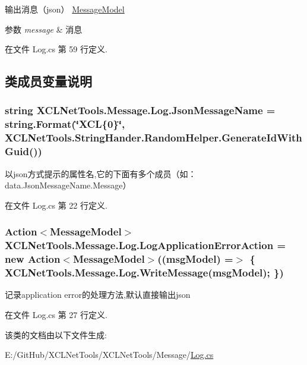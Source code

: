 输出消息（json） \hyperlink{class_x_c_l_net_tools_1_1_message_1_1_message_model}{Message\+Model} 


\begin{DoxyParams}{参数}
{\em message} & 消息\\
\hline
\end{DoxyParams}


在文件 Log.\+cs 第 59 行定义.



\subsection{类成员变量说明}
\subsubsection[{\texorpdfstring{Json\+Message\+Name}{JsonMessageName}}]{\setlength{\rightskip}{0pt plus 5cm}string X\+C\+L\+Net\+Tools.\+Message.\+Log.\+Json\+Message\+Name = string.\+Format(\char`\"{}X\+CL\{0\}\char`\"{}, X\+C\+L\+Net\+Tools.\+String\+Hander.\+Random\+Helper.\+Generate\+Id\+With\+Guid())\hspace{0.3cm}{\ttfamily [static]}}\hypertarget{class_x_c_l_net_tools_1_1_message_1_1_log_ac9218999b3da2b5fbd7476e1ae47ca71}{}\label{class_x_c_l_net_tools_1_1_message_1_1_log_ac9218999b3da2b5fbd7476e1ae47ca71}


以json方式提示的属性名,它的下面有多个成员（如：data.\+Json\+Message\+Name.\+Message） 



在文件 Log.\+cs 第 22 行定义.

\subsubsection[{\texorpdfstring{Log\+Application\+Error\+Action}{LogApplicationErrorAction}}]{\setlength{\rightskip}{0pt plus 5cm}Action$<${\bf Message\+Model}$>$ X\+C\+L\+Net\+Tools.\+Message.\+Log.\+Log\+Application\+Error\+Action = new Action$<${\bf Message\+Model}$>$((msg\+Model) =$>$ \{ {\bf X\+C\+L\+Net\+Tools.\+Message.\+Log.\+Write\+Message}(msg\+Model); \})\hspace{0.3cm}{\ttfamily [static]}}\hypertarget{class_x_c_l_net_tools_1_1_message_1_1_log_aeb571cf7294cbdc7776e44c5654b28d4}{}\label{class_x_c_l_net_tools_1_1_message_1_1_log_aeb571cf7294cbdc7776e44c5654b28d4}


记录application error的处理方法,默认直接输出json 



在文件 Log.\+cs 第 27 行定义.



该类的文档由以下文件生成\+:\begin{DoxyCompactItemize}
\item 
E\+:/\+Git\+Hub/\+X\+C\+L\+Net\+Tools/\+X\+C\+L\+Net\+Tools/\+Message/\hyperlink{_log_8cs}{Log.\+cs}\end{DoxyCompactItemize}
